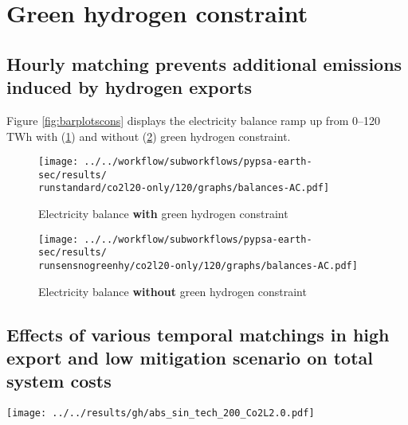 \section{Green hydrogen constraint}
\label{subsec:gh_constraint_effects}

\subsection{Hourly matching prevents additional emissions induced by hydrogen exports}
Figure \ref{fig:barplotscons} displays the electricity balance ramp up from 0--120 TWh with (\ref{fig:balances_AC_monthlymatch}) and without (\ref{fig:balances_AC_nogreen}) green hydrogen constraint.

\begin{figure*}[h!]
    \centering
    \begin{subfigure}[b]{0.49\linewidth}
        \centering
        \texttt{[image: ../../workflow/subworkflows/pypsa-earth-sec/results/\\runstandard/co2l20-only/120/graphs/balances-AC.pdf]}
        \caption{Electricity balance {\bf with} green hydrogen constraint}
        \label{fig:balances_AC_monthlymatch}
    \end{subfigure}
    \hfill
    \begin{subfigure}[b]{0.49\linewidth}
        \centering
        \texttt{[image: ../../workflow/subworkflows/pypsa-earth-sec/results/\\runsensnogreenhy/co2l20-only/120/graphs/balances-AC.pdf]}
        \caption{Electricity balance {\bf without} green hydrogen constraint}
        \label{fig:balances_AC_nogreen}
    \end{subfigure}
    \hfill
    \caption{Electricity balance ramp up from 0--120 TWh with (\ref{fig:balances_AC_monthlymatch}) and without (\ref{fig:balances_AC_nogreen}) green hydrogen constraint}
    \label{fig:barplotscons}
\end{figure*}


\subsection{Effects of various temporal matchings in high export and low mitigation scenario on total system costs}

\begin{figure*}[h]
    \centering
    \texttt{[image: ../../results/gh/abs\_sin\_tech\_200\_Co2L2.0.pdf]}
    \caption{Total system costs at 200 TWh export and 0\% domestic mitigation. Stricter hydrogen regulation mainly increases the total CAPEX of additional solar PV, electrolysis and hydrogen storage. In return, the OPEX of fossil generation (mainly gas), decreases. The large share of oil OPEX is independent of hydrogen regulation, since these costs are mainly linked to combustion engine cars with demands independent of hydrogen regulation.}
    \label{fig:tsc-200-0}
\end{figure*}




